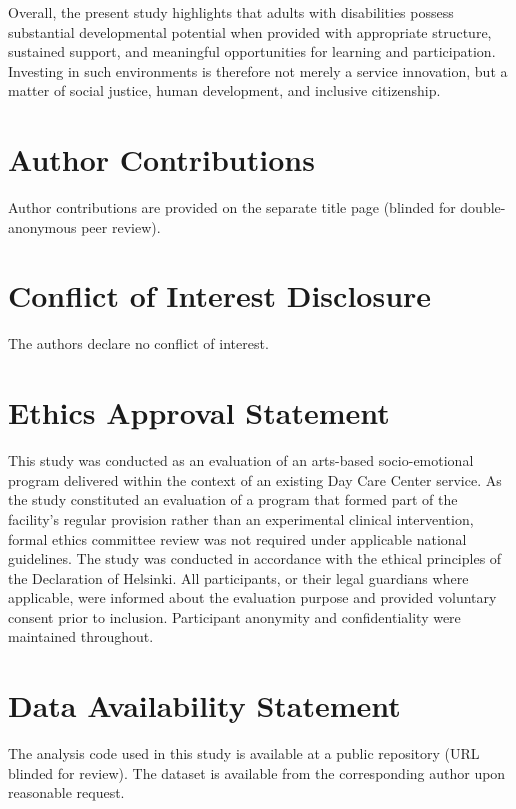 \documentclass[12pt,a4paper]{article}
\begin{document}
Overall, the present study highlights that adults with disabilities possess substantial developmental potential when provided with appropriate structure, sustained support, and meaningful opportunities for learning and participation. Investing in such environments is therefore not merely a service innovation, but a matter of social justice, human development, and inclusive citizenship.


\section*{Author Contributions}
Author contributions are provided on the separate title page (blinded for double-anonymous peer review).


\section*{Conflict of Interest Disclosure}
The authors declare no conflict of interest.

\section*{Ethics Approval Statement}
This study was conducted as an evaluation of an arts-based socio-emotional
program delivered within the context of an existing Day Care Center service.
As the study constituted an evaluation of a program that formed part of the
facility's regular provision rather than an experimental clinical intervention,
formal ethics committee review was not required under applicable national
guidelines. The study was conducted in accordance with the ethical principles
of the Declaration of Helsinki. All participants, or their legal guardians
where applicable, were informed about the evaluation purpose and provided
voluntary consent prior to inclusion. Participant anonymity and
confidentiality were maintained throughout.

\section*{Data Availability Statement}
The analysis code used in this study is available at a public repository (URL blinded for review). The dataset is available from the corresponding author upon reasonable request.
\end{document}
